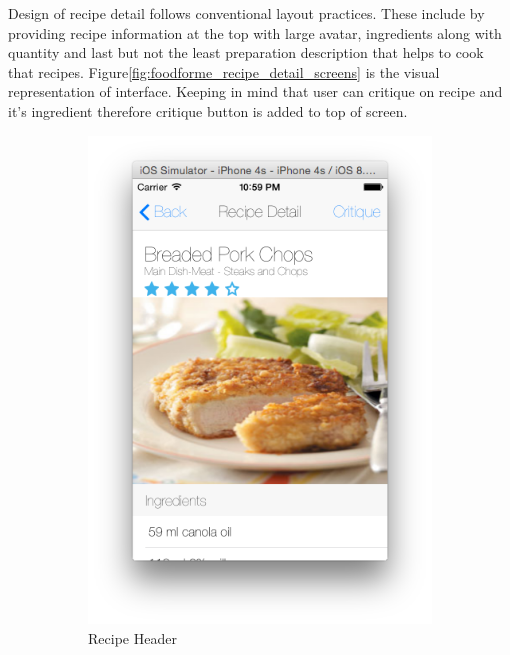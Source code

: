 Design of recipe detail follows conventional layout practices. These include by providing recipe information at the top with large avatar, ingredients along with quantity and last but not the least preparation description that helps to cook that recipes. Figure\ref{fig:foodforme_recipe_detail_screens} is the visual representation of interface. Keeping in mind that user can critique on recipe and it’s ingredient therefore critique button is added to top of screen. 
	  \begin{figure}[h]
	  	\begin{subfigure}{.32\textwidth}
	  		\includegraphics[width=.9\linewidth]{figures/ch4_app_screen_shots/recipe_detail/recipe_detail_1.png}
	  		\caption{Recipe Header}
	  	\end{subfigure}
	  	\begin{subfigure}{.32\textwidth}

\end{subfigure}
\end{figure}
